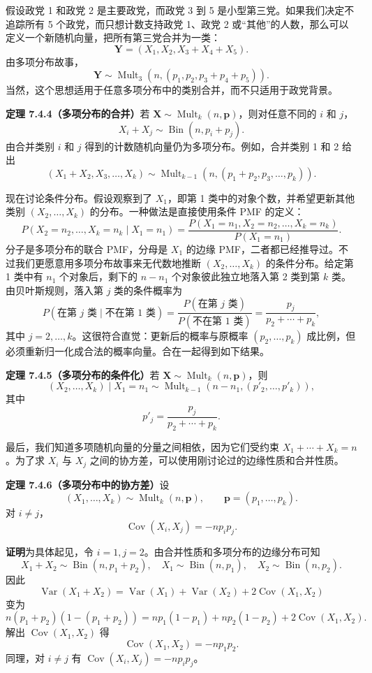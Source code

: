 \documentclass[UTF8, 12pt, fontset=fandol, oneside]{ctexart}
\begin{document}
假设政党 1 和政党 2 是主要政党，而政党 3 到 5 是小型第三党。如果我们决定不追踪所有 5 个政党，而只想计数支持政党 1、政党 2 或“其他”的人数，那么可以定义一个新随机向量，把所有第三党合并为一类：
\[
  \mathbf{Y}=(X_1,X_2,X_3+X_4+X_5).
\]
由多项分布故事，
\[
  \mathbf{Y}\sim \operatorname{Mult}_3(n,(p_1,p_2,p_3+p_4+p_5)).
\]
当然，这个思想适用于任意多项分布中的类别合并，而不只适用于政党背景。

\noindent\textbf{定理 7.4.4（多项分布的合并）}\quad 若 $\mathbf{X}\sim \operatorname{Mult}_k(n,\mathbf{p})$，则对任意不同的 $i$ 和 $j$，
\[
  X_i+X_j\sim \operatorname{Bin}(n,p_i+p_j).
\]
由合并类别 $i$ 和 $j$ 得到的计数随机向量仍为多项分布。例如，合并类别 1 和 2 给出
\[
  (X_1+X_2,X_3,\ldots,X_k)
  \sim \operatorname{Mult}_{k-1}(n,(p_1+p_2,p_3,\ldots,p_k)).
\]

现在讨论条件分布。假设观察到了 $X_1$，即第 1 类中的对象个数，并希望更新其他类别 $(X_2,\ldots,X_k)$ 的分布。一种做法是直接使用条件 PMF 的定义：
\[
  P(X_2=n_2,\ldots,X_k=n_k\mid X_1=n_1)
  =\frac{P(X_1=n_1,X_2=n_2,\ldots,X_k=n_k)}{P(X_1=n_1)}.
\]
分子是多项分布的联合 PMF，分母是 $X_1$ 的边缘 PMF，二者都已经推导过。不过我们更愿意用多项分布故事来无代数地推断 $(X_2,\ldots,X_k)$ 的条件分布。给定第 1 类中有 $n_1$ 个对象后，剩下的 $n-n_1$ 个对象彼此独立地落入第 2 类到第 $k$ 类。由贝叶斯规则，落入第 $j$ 类的条件概率为
\[
  P(\text{在第 }j\text{ 类}\mid \text{不在第 }1\text{ 类})
  =\frac{P(\text{在第 }j\text{ 类})}{P(\text{不在第 }1\text{ 类})}
  =\frac{p_j}{p_2+\cdots+p_k},
\]
其中 $j=2,\ldots,k$。这很符合直觉：更新后的概率与原概率 $(p_2,\ldots,p_k)$ 成比例，但必须重新归一化成合法的概率向量。合在一起得到如下结果。

\noindent\textbf{定理 7.4.5（多项分布的条件化）}\quad 若 $\mathbf{X}\sim \operatorname{Mult}_k(n,\mathbf{p})$，则
\[
  (X_2,\ldots,X_k)\mid X_1=n_1
  \sim \operatorname{Mult}_{k-1}(n-n_1,(p'_2,\ldots,p'_k)),
\]
其中
\[
  p'_j=\frac{p_j}{p_2+\cdots+p_k}.
\]

最后，我们知道多项随机向量的分量之间相依，因为它们受约束 $X_1+\cdots+X_k=n$。为了求 $X_i$ 与 $X_j$ 之间的协方差，可以使用刚讨论过的边缘性质和合并性质。

\noindent\textbf{定理 7.4.6（多项分布中的协方差）}\quad 设
\[
  (X_1,\ldots,X_k)\sim \operatorname{Mult}_k(n,\mathbf{p}),
  \qquad \mathbf{p}=(p_1,\ldots,p_k).
\]
对 $i\ne j$，
\[
  \operatorname{Cov}(X_i,X_j)=-np_ip_j.
\]

\noindent\textbf{证明}\quad 为具体起见，令 $i=1,j=2$。由合并性质和多项分布的边缘分布可知
\[
  X_1+X_2\sim \operatorname{Bin}(n,p_1+p_2),\quad
  X_1\sim \operatorname{Bin}(n,p_1),\quad
  X_2\sim \operatorname{Bin}(n,p_2).
\]
因此
\[
  \operatorname{Var}(X_1+X_2)
  =\operatorname{Var}(X_1)+\operatorname{Var}(X_2)+2\operatorname{Cov}(X_1,X_2)
\]
变为
\[
  n(p_1+p_2)(1-(p_1+p_2))
  =np_1(1-p_1)+np_2(1-p_2)+2\operatorname{Cov}(X_1,X_2).
\]
解出 $\operatorname{Cov}(X_1,X_2)$ 得
\[
  \operatorname{Cov}(X_1,X_2)=-np_1p_2.
\]
同理，对 $i\ne j$ 有 $\operatorname{Cov}(X_i,X_j)=-np_ip_j$。
\end{document}
